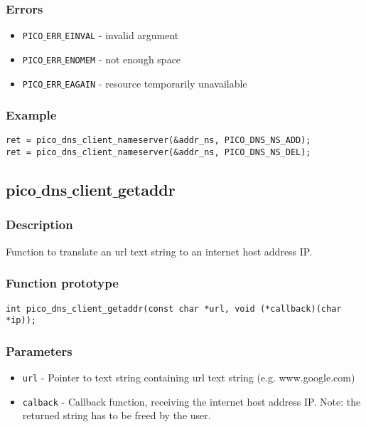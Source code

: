 \subsubsection*{Errors}
\begin{itemize}[noitemsep]
\item \texttt{PICO$\_$ERR$\_$EINVAL} - invalid argument
\item \texttt{PICO$\_$ERR$\_$ENOMEM} - not enough space
\item \texttt{PICO$\_$ERR$\_$EAGAIN} - resource temporarily unavailable
\end{itemize}

\subsubsection*{Example}
\begin{verbatim}
ret = pico_dns_client_nameserver(&addr_ns, PICO_DNS_NS_ADD);
ret = pico_dns_client_nameserver(&addr_ns, PICO_DNS_NS_DEL);
\end{verbatim}



\subsection{pico$\_$dns$\_$client$\_$getaddr}

\subsubsection*{Description}
Function to translate an url text string to an internet host address IP. 

\subsubsection*{Function prototype}
\begin{verbatim}
int pico_dns_client_getaddr(const char *url, void (*callback)(char *ip));
\end{verbatim}

\subsubsection*{Parameters}
\begin{itemize}[noitemsep]
\item \texttt{url} - Pointer to text string containing url text string (e.g. www.google.com)
\item \texttt{calback} - Callback function, receiving the internet host address IP. Note: the returned string has to be freed by the user.
\end{itemize}

